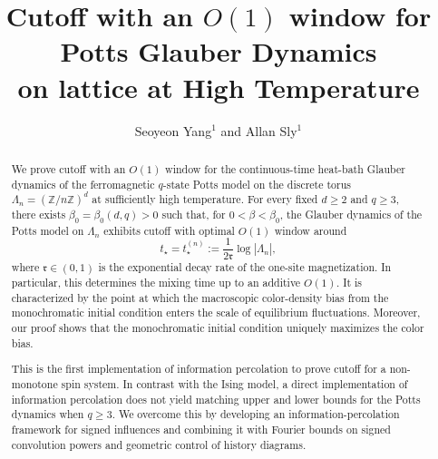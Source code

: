 \documentclass[letterpaper,11pt,reqno]{amsart}
\theoremstyle{definition}
\begin{document}
\title[Potts]{Cutoff with an $O(1)$ window for Potts Glauber Dynamics\\on lattice at High Temperature}



\author[S. Yang and A. Sly]
       {Seoyeon Yang$^1$ and Allan Sly$^1$}

\address{$^1$Department of Mathematics,
  Princeton University,
  Princeton, NJ 08540, USA}
  
\begin{abstract}
We prove cutoff with an $O(1)$ window for the continuous-time heat-bath Glauber dynamics of the ferromagnetic $q$-state Potts model on the discrete torus $\Lambda_n=(\mathbb Z/n\mathbb Z)^d$
at sufficiently high temperature. For every fixed $d\ge2$ and $q\ge3$, there exists $\beta_0=\beta_0(d,q)>0$ such that, for $0<\beta<\beta_0$, the Glauber dynamics of the Potts model on $\Lambda_n$
exhibits cutoff with optimal $O(1)$ window around
\[
t_\star=t_\star^{(n)}:=\frac{1}{2\mathfrak{r}}\log |\Lambda_n|,
\]
where $\mathfrak{r}\in(0,1)$ is the exponential decay rate of the one-site magnetization.
In particular, this determines the mixing time up to an additive $O(1)$. It is characterized by the point at which the macroscopic color-density bias from the monochromatic initial condition enters the scale of equilibrium fluctuations. Moreover, our proof shows that the monochromatic initial condition uniquely maximizes the color bias.

This is the first implementation of information percolation to prove cutoff for a non-monotone spin system. In contrast with the Ising model, a direct implementation of information percolation does not yield matching upper and lower bounds for the Potts dynamics when $q\ge3$. 
We overcome this by developing an information-percolation framework for signed influences and combining it with Fourier bounds on signed convolution powers and geometric control of history diagrams.

\end{abstract}
\maketitle
\end{document}
